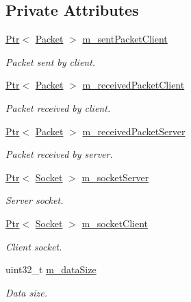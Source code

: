 \subsection*{Private Attributes}
\begin{DoxyCompactItemize}
\item 
\hyperlink{classns3_1_1Ptr}{Ptr}$<$ \hyperlink{classns3_1_1Packet}{Packet} $>$ \hyperlink{classIpv4FragmentationTest_a2101eb6eb2f3da7f4ba981a08fbf84e0}{m\+\_\+sent\+Packet\+Client}
\begin{DoxyCompactList}\small\item\em Packet sent by client. \end{DoxyCompactList}\item 
\hyperlink{classns3_1_1Ptr}{Ptr}$<$ \hyperlink{classns3_1_1Packet}{Packet} $>$ \hyperlink{classIpv4FragmentationTest_a006c01f850b31012c3d7794c488fa4a1}{m\+\_\+received\+Packet\+Client}
\begin{DoxyCompactList}\small\item\em Packet received by client. \end{DoxyCompactList}\item 
\hyperlink{classns3_1_1Ptr}{Ptr}$<$ \hyperlink{classns3_1_1Packet}{Packet} $>$ \hyperlink{classIpv4FragmentationTest_a1cda7da1e37a2413ce73e54a395ecf4a}{m\+\_\+received\+Packet\+Server}
\begin{DoxyCompactList}\small\item\em Packet received by server. \end{DoxyCompactList}\item 
\hyperlink{classns3_1_1Ptr}{Ptr}$<$ \hyperlink{classns3_1_1Socket}{Socket} $>$ \hyperlink{classIpv4FragmentationTest_a5960ce9f8f50e1635921f941c0388f15}{m\+\_\+socket\+Server}
\begin{DoxyCompactList}\small\item\em Server socket. \end{DoxyCompactList}\item 
\hyperlink{classns3_1_1Ptr}{Ptr}$<$ \hyperlink{classns3_1_1Socket}{Socket} $>$ \hyperlink{classIpv4FragmentationTest_a75297f7fa134ce427f34f866c4372877}{m\+\_\+socket\+Client}
\begin{DoxyCompactList}\small\item\em Client socket. \end{DoxyCompactList}\item 
uint32\+\_\+t \hyperlink{classIpv4FragmentationTest_ac2d67ec7308b06170caa50497ac634a9}{m\+\_\+data\+Size}
\begin{DoxyCompactList}\small\item\em Data size. \end{DoxyCompactList}\item 

\end{DoxyCompactItemize}
